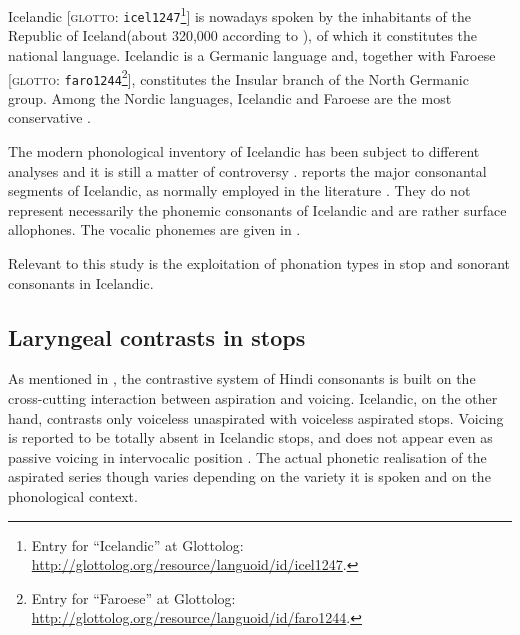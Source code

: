 \documentclass[11pt,a4paper,openany]{memoir}\usepackage[]{graphicx}\usepackage[]{color}
\begin{document}
Icelandic [\textsc{glotto}: \texttt{icel1247}\footnote{Entry for ``Icelandic'' at Glottolog: \url{http://glottolog.org/resource/languoid/id/icel1247}.}] is nowadays spoken by the inhabitants of the Republic of Iceland(about 320,000 according to \citealt{arnason2011}), of which it constitutes the national language.
Icelandic is a Germanic language and, together with Faroese [\textsc{glotto}: \texttt{faro1244}\footnote{Entry for ``Faroese'' at Glottolog: \url{http://glottolog.org/resource/languoid/id/faro1244}.}], constitutes the Insular branch of the North Germanic group.
Among the Nordic languages, Icelandic and Faroese are the most conservative \citep{harbert2006,konig2013}.

The modern phonological inventory of Icelandic has been subject to different analyses and it is still a matter of controversy \citep{thraisson1978,jessen1998,arnason2011}.
 reports the major consonantal segments of Icelandic, as normally employed in the literature \citep[98]{arnason2011}.
They do not represent necessarily the phonemic consonants of Icelandic and are rather surface allophones.
The vocalic phonemes are given in  \citep[60]{arnason2011}.



Relevant to this study is the exploitation of phonation types in stop and sonorant consonants in Icelandic.

\subsection{Laryngeal contrasts in stops}

As mentioned in , the contrastive system of Hindi consonants is built on the cross-cutting interaction between aspiration and voicing.
Icelandic, on the other hand, contrasts only voiceless unaspirated with voiceless aspirated stops.
Voicing is reported to be totally absent in Icelandic stops, and does not appear even as passive voicing in intervocalic position \citep{arnason2011}.
The actual phonetic realisation of the aspirated series though varies depending on the variety it is spoken and on the phonological context.
\end{document}
